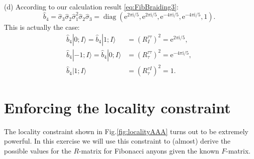 \documentclass{book}
\begin{document}
(d) According to our calculation result \eqref{eq:FibBraiding3}:
\begin{equation*}
\hat{b}_{4} =\hat{\sigma }_{3}\hat{\sigma }_{2}\hat{\sigma }_{1}^{2}\hat{\sigma }_{2}\hat{\sigma }_{3} =\operatorname{diag} (\mathrm{e}^{2\pi \mathrm{i} /5} ,\mathrm{e}^{2\pi \mathrm{i} /5} ,\mathrm{e}^{-4\pi \mathrm{i} /5} ,\mathrm{e}^{-4\pi \mathrm{i} /5} ,1).
\end{equation*}
This is actually the case:
\begin{equation*}
\begin{aligned}
\hat{b}_{4} |0;I\rangle =\hat{b}_{4} |1;I \rangle  & =(R_{I}^{\tau \tau } )^{2} =\mathrm{e}^{2\pi \mathrm{i} /5} ,\\
\hat{b}_{4} |-1;I\rangle =\hat{b}_{4} |0;I \rangle  & =(R_{\tau }^{\tau \tau } )^{2} =\mathrm{e}^{-4\pi \mathrm{i} /5} ,\\
\hat{b}_{4} |1;I \rangle  & =(R_{\tau }^{\tau I} )^{2} =1.
\end{aligned}
\end{equation*}


\section{Enforcing the locality constraint}
The locality constraint shown in Fig.\ref{fig:localityAAA} turns out to be extremely powerful. In this exercise we will use this constraint to (almost) derive the possible values for the $R$-matrix for Fibonacci anyons given the known $F$-matrix.
\end{document}
